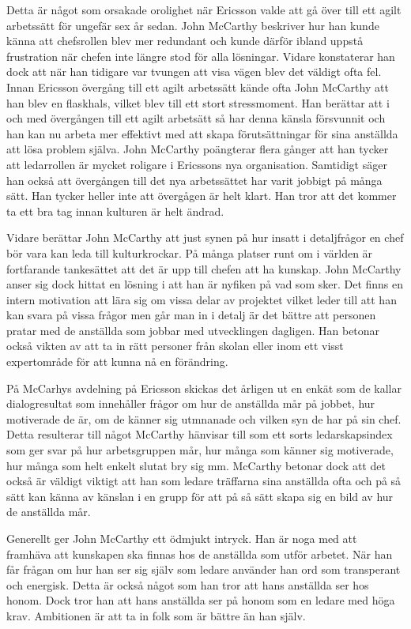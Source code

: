 Detta är något som orsakade orolighet när Ericsson valde att gå över till ett agilt arbetssätt för ungefär sex år sedan. John McCarthy beskriver hur han kunde känna att chefsrollen blev mer redundant och kunde därför ibland uppstå frustration när chefen inte längre stod för alla lösningar. Vidare konstaterar han dock att när han tidigare var tvungen att visa vägen blev det väldigt ofta fel. Innan Ericsson övergång till ett agilt arbetssätt kände ofta John McCarthy att han blev en flaskhals, vilket blev till ett stort stressmoment. Han berättar att i och med övergången till ett agilt arbetsätt så har denna känsla försvunnit och han kan nu arbeta mer effektivt med att skapa förutsättningar för sina anställda att lösa problem själva. John McCarthy poängterar flera gånger att han tycker att ledarrollen är mycket roligare i Ericssons nya organisation. Samtidigt säger han också att övergången till det nya arbetssättet har varit jobbigt på många sätt. Han tycker heller inte att övergågen är helt klart. Han tror att det kommer ta ett bra tag innan kulturen är helt ändrad.

Vidare berättar John McCarthy att just synen på hur insatt i detaljfrågor en chef bör vara kan leda till kulturkrockar. På många platser runt om i världen är fortfarande tankesättet att det är upp till chefen att ha kunskap. John McCarthy anser sig dock hittat en lösning i att han är nyfiken på vad som sker. Det finns en intern motivation att lära sig om vissa delar av projektet vilket leder till att han kan svara på vissa frågor men går man in i detalj är det bättre att personen pratar med de anställda som jobbar med utvecklingen dagligen. Han betonar också vikten av att ta in rätt personer från skolan eller inom ett visst expertområde för att kunna nå en förändring.

På McCarhys avdelning på Ericsson skickas det årligen ut en enkät som de kallar dialogresultat som innehåller frågor om hur de anställda mår på jobbet, hur motiverade de är, om de känner sig utmnanade och vilken syn de har på sin chef. Detta resulterar till något McCarthy hänvisar till som ett sorts ledarskapsindex som ger svar på hur arbetsgruppen mår, hur många som känner sig motiverade, hur många som helt enkelt slutat bry sig mm. McCarthy betonar dock att det också är väldigt viktigt att han som ledare träffarna sina anställda ofta och på så sätt kan känna av känslan i en grupp för att på så sätt skapa sig en bild av hur de anställda mår.

Generellt ger John McCarthy ett ödmjukt intryck. Han är noga med att framhäva att kunskapen ska finnas hos de anställda som utför arbetet. När han får frågan om hur han ser sig själv som ledare använder han ord som transperant och energisk. Detta är också något som han tror att hans anställda ser hos honom. Dock tror han att hans anställda ser på honom som en ledare med höga krav. Ambitionen är att ta in folk som är bättre än han själv.